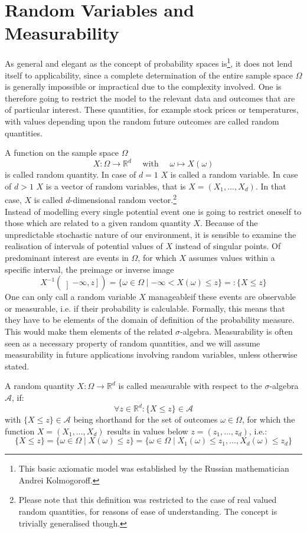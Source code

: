 \documentclass[12pt]{article}
\begin{document}
\section{Random Variables and Measurability}
As general and elegant as the concept of probability spaces is\footnote{This basic axiomatic model was established by the Russian mathematician Andrei Kolmogoroff.}, it does not lend itself to applicability, since a complete determination of the entire sample space $\Omega$
is generally impossible or impractical due to the complexity involved. One is therefore going to restrict the model to the relevant data and outcomes that are of particular interest.
These quantities, for example stock prices or temperatures, with values depending upon the random future outcomes are called random quantities.

A function on the sample space $\Omega$ \[
X : \Omega \to \mathbb{R}^d \quad \text{  with  }\quad \omega \mapsto X(\omega)
\]
is called random quantity. In case of $d=1$ $X$ is called a random variable. In case of
$d>1$ $X$ is a vector of random variables, that is $X = (X_1, . . . , X_d)$. In that case, $X$ is called $d$-dimensional random vector.\footnote{Please note that this definition was restricted to the case of real valued random quantities, for reasons of ease of understanding. The concept is trivially generalised though.}
\\
Instead of modelling every single potential event one is going to restrict oneself to those which are related to a given random quantity $X$. Because of the unpredictable stochastic nature of our environment, it is sensible to examine the realisation of intervals of potential values of $X$ instead of singular points. Of predominant  interest are events in $\Omega$, for which $X$ assumes values within a specific interval, the preimage or inverse image \[
X^{-1}(\left] -\infty, z \right] ) = \{ \omega \in \Omega \mid -\infty < X(\omega) \leq z \} =: \{ X \leq z \}
\]
One can only call a random variable $X$ \glqq manageable\grqq if these events are observable or \glqq measurable\grqq, i.e. if their probability is calculable.
Formally, this means that they have to be elements of the domain of definition of the probability measure.
This would make them elements of the related $\sigma$-algebra. Measurability is often seen as a necessary property of random quantities,
and we will assume measurability in future applications involving random variables, unless otherwise stated.

A random quantity $X : \Omega \to \mathbb{R}^d $ is called measurable with respect to the $\sigma$-algebra $\mathscr{A}$, if:
\[
\forall z \in \mathbb{R}^d : \{X \leq z\} \in \mathscr{A}
\]
with $\{X \leq z\} \in \mathscr{A}$ being shorthand for the set of outcomes $\omega \in \Omega$, for which the function $X = (X_1, . . . , X_d)$ results in values below $z = (z_1, . . . , z_d)$, i.e.:
\[
\{X \leq z\} = \{\omega \in \Omega \mid X(\omega) \leq z\} = \{\omega \in \Omega \mid X_1(\omega)\leq z_1, ..., X_d(\omega)\leq z_d\}
\]
\end{document}
